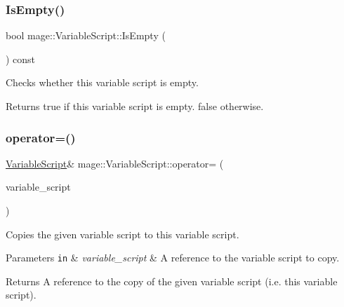 \subsubsection{\texorpdfstring{Is\+Empty()}{IsEmpty()}}
{\footnotesize\ttfamily bool mage\+::\+Variable\+Script\+::\+Is\+Empty (\begin{DoxyParamCaption}{ }\end{DoxyParamCaption}) const}

Checks whether this variable script is empty.

\begin{DoxyReturn}{Returns}
{\ttfamily true} if this variable script is empty. {\ttfamily false} otherwise. 
\end{DoxyReturn}
\hypertarget{classmage_1_1_variable_script_ae090b066ea939fc6611e77a47df6a97f}{}\label{classmage_1_1_variable_script_ae090b066ea939fc6611e77a47df6a97f} 
\subsubsection{\texorpdfstring{operator=()}{operator=()}\hspace{0.1cm}{\footnotesize\ttfamily [1/2]}}
{\footnotesize\ttfamily \hyperlink{classmage_1_1_variable_script}{Variable\+Script}\& mage\+::\+Variable\+Script\+::operator= (\begin{DoxyParamCaption}\item[{const \hyperlink{classmage_1_1_variable_script}{Variable\+Script} \&}]{variable\+\_\+script }\end{DoxyParamCaption})\hspace{0.3cm}{\ttfamily [delete]}}

Copies the given variable script to this variable script.


\begin{DoxyParams}[1]{Parameters}
\mbox{\tt in}  & {\em variable\+\_\+script} & A reference to the variable script to copy. \\
\hline
\end{DoxyParams}
\begin{DoxyReturn}{Returns}
A reference to the copy of the given variable script (i.\+e. this variable script). 
\end{DoxyReturn}
\hypertarget{classmage_1_1_variable_script_a4602887cc8b6c45a169af7822cf744a1}{}\label{classmage_1_1_variable_script_a4602887cc8b6c45a169af7822cf744a1} 
